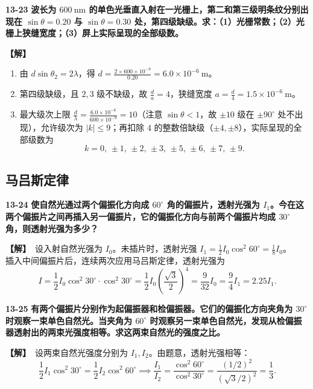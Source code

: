 \documentclass[zihao=5,a4paper,UTF8]{ctexart}
\newenvironment{prob}[2]{%
    \par\vspace{6pt}\noindent\textbf{\color{navy}#1} \textbf{#2}\par\nopagebreak\vspace{2pt}%
}{%
    \par\vspace{4pt}%
}
\newcommand{\sol}{\noindent\textbf{\color{tealaccent}【解】}\ }
\begin{document}
\begin{prob}{13-23}{波长为 $600\ \mathrm{nm}$ 的单色光垂直入射在一光栅上，第二和第三级明条纹分别出现在 $\sin\theta = 0.20$ 与 $\sin\theta = 0.30$ 处，第四级缺级。求：（1）光栅常数；（2）光栅上狭缝宽度；（3）屏上实际呈现的全部级数。}
\sol
\begin{enumerate}[leftmargin=2em, itemsep=2pt]
    \item 由 $d\sin\theta_2 = 2\lambda$，得 $d = \frac{2\times 600\times 10^{-9}}{0.20} = 6.0\times 10^{-6}\ \mathrm{m}$。
    \item 第四级缺级，且 $2, 3$ 级不缺级，故 $\frac{d}{a} = 4$，狭缝宽度 $a = \frac{d}{4} = 1.5\times 10^{-6}\ \mathrm{m}$。
    \item 最大级次上限 $\frac{d}{\lambda} = \frac{6.0\times 10^{-6}}{600\times 10^{-9}} = 10$（注意 $\sin\theta < 1$，故 $\pm 10$ 级在 $\pm 90^\circ$ 处不出现），允许级次为 $|k|\le 9$；再扣除 $4$ 的整数倍缺级（$\pm 4, \pm 8$），实际呈现的全部级数为
    \[
        k = 0,\, \pm 1,\, \pm 2,\, \pm 3,\, \pm 5,\, \pm 6,\, \pm 7,\, \pm 9.
    \]
\end{enumerate}
\end{prob}

\subsection{马吕斯定律}

\begin{prob}{13-24}{使自然光通过两个偏振化方向成 $60^\circ$ 角的偏振片，透射光强为 $I_1$。今在这两个偏振片之间再插入另一偏振片，它的偏振化方向与前两个偏振片均成 $30^\circ$ 角，则透射光强为多少？}
\sol 设入射自然光强为 $I_0$。未插片时，透射光强 $I_1 = \frac{1}{2}I_0\cos^2 60^\circ = \frac{1}{8}I_0$。\\
插入中间偏振片后，连续两次应用马吕斯定律，透射光强为
\[
    I = \frac{1}{2}I_0 \cos^2 30^\circ \cdot \cos^2 30^\circ = \frac{1}{2}I_0 \left(\frac{\sqrt{3}}{2}\right)^4 = \frac{9}{32}I_0 = \frac{9}{4}I_1 = 2.25I_1.
\]
\end{prob}

\begin{prob}{13-25}{有两个偏振片分别作为起偏振器和检偏振器。它们的偏振化方向夹角为 $30^\circ$ 时观察一束单色自然光。当夹角为 $60^\circ$ 时观察另一束单色自然光，发现从检偏振器透射出的两束光强度相等。求这两束自然光的强度之比。}
\sol 设两束自然光强度分别为 $I_1, I_2$。由题意，透射光强相等：
\[
    \frac{1}{2}I_1\cos^2 30^\circ = \frac{1}{2}I_2\cos^2 60^\circ \implies \frac{I_1}{I_2} = \frac{\cos^2 60^\circ}{\cos^2 30^\circ} = \frac{(1/2)^2}{(\sqrt{3}/2)^2} = \frac{1}{3}.
\]
\end{prob}
\end{document}
